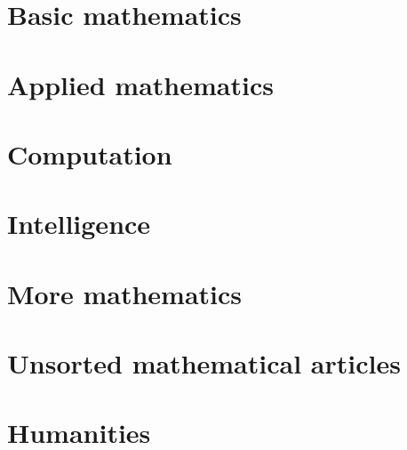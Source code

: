 \documentclass[10pt,book,openany]{memoir}
\begin{document}
\setlength\abovedisplayskip{0em}
\setlength\belowdisplayskip{0em}
\setlength\abovedisplayshortskip{0em}
\setlength\belowdisplayshortskip{0em}
\frontmatter

\newpage

\newpage

\newpage
{%
\setlength\cftbeforepartskip{1em}%
\setlength\cftbeforechapterskip{0em}%
\renewcommand{\contentsname}{Chapters}%
\renewcommand{\cftpartfont}{\normalsize\bfseries}%
\renewcommand{\cftchapterfont}{\normalsize}%
\renewcommand{\cftchapterpagefont}{\normalsize}%
\setcounter{tocdepth}{0}%
\tableofcontents%
\clearpage%
}%
{\setcounter{tocdepth}{3}%
\newpage%
\tableofcontents%
}
\mainmatter
\part{Basic mathematics}









\part{Applied mathematics}




\part{Computation}




\part{Intelligence}










\part{More mathematics}







\part{Unsorted mathematical articles}


\part{Humanities}




\end{document}
